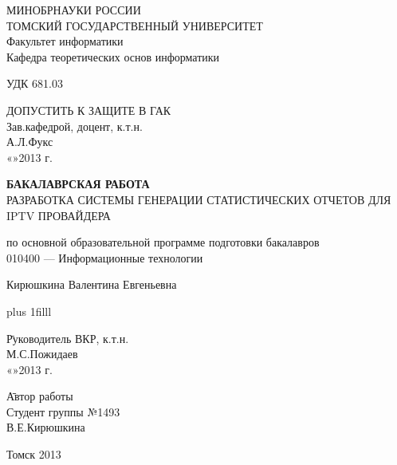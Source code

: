 \large
\thispagestyle{empty}
\begin{center}
МИНОБРНАУКИ РОССИИ\\
ТОМСКИЙ ГОСУДАРСТВЕННЫЙ УНИВЕРСИТЕТ\\
Факультет информатики\\
Кафедра теоретических основ информатики\\
\end{center}

УДК 681.03

\vspace{0.5cm}

\begin{flushright}
ДОПУСТИТЬ К ЗАЩИТЕ В ГАК\\
Зав.кафедрой, доцент, к.т.н.\\
\makebox[3cm]{\hrulefill}А.Л.Фукс\\
«\makebox[0.8cm]{\hrulefill}»\makebox[1.5cm]{\hrulefill}2013 г.\\
\end{flushright}



\begin{center}

\vspace{1.5cm}
{\bf БАКАЛАВРСКАЯ РАБОТА}\\
\vspace{0.5cm}
РАЗРАБОТКА СИСТЕМЫ ГЕНЕРАЦИИ СТАТИСТИЧЕСКИХ ОТЧЕТОВ ДЛЯ IPTV ПРОВАЙДЕРА

\vspace{0.5cm}
по основной образовательной программе подготовки бакалавров\\
010400 --- Информационные технологии

\vspace{0.5cm}

Кирюшкина Валентина Евгеньевна


\end{center}

\vskip 0pt plus 1filll

\begin{tabbing}
\hspace{10cm}\=Руководитель ВКР, к.т.н.\\
\>\makebox[3cm]{\hrulefill}М.С.Пожидаев\\
\>«\makebox[0.8cm]{\hrulefill}»\makebox[1.5cm]{\hrulefill}2013 г.\\
\end{tabbing}

\begin{tabbing}
\hspace{10cm}\=Автор работы\\
\>Студент группы №1493\\
\>\makebox[3cm]{\hrulefill}В.Е.Кирюшкина\\
\end{tabbing}

\vspace*{1cm}

\begin{center}
Томск 2013
\end{center}
\normalsize

